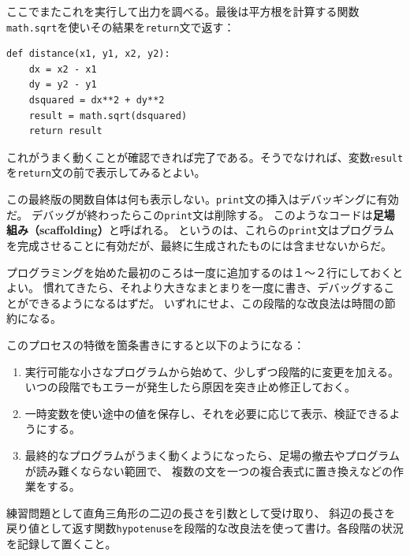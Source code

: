 \documentclass[a4j,12pt,makeidx]{jbook}
\begin{document}
ここでまたこれを実行して出力を調べる。最後は平方根を計算する関数{\tt math.sqrt}を使いその結果を{\tt return}文で返す：
\begin{verbatim}
def distance(x1, y1, x2, y2):
    dx = x2 - x1
    dy = y2 - y1
    dsquared = dx**2 + dy**2
    result = math.sqrt(dsquared)
    return result
\end{verbatim}
これがうまく動くことが確認できれば完了である。そうでなければ、変数r{\tt esult}を{\tt return}文の前で表示してみるとよい。\par
この最終版の関数自体は何も表示しない。{\tt print}文の挿入はデバッギングに有効だ。
デバッグが終わったらこの{\tt print}文は削除する。
このようなコードは{\bf 足場組み（scaffolding）}と呼ばれる。
というのは、これらの{\tt print}文はプログラムを完成させることに有効だが、最終に生成されたものには含ませないからだ。 \par
プログラミングを始めた最初のころは一度に追加するのは１～２行にしておくとよい。
慣れてきたら、それより大きなまとまりを一度に書き、デバッグすることができるようになるはずだ。
いずれにせよ、この段階的な改良法は時間の節約になる。\par
このプロセスの特徴を箇条書きにすると以下のようになる：
\begin{enumerate}
\item 実行可能な小さなプログラムから始めて、少しずつ段階的に変更を加える。
いつの段階でもエラーが発生したら原因を突き止め修正しておく。
\item 一時変数を使い途中の値を保存し、それを必要に応じて表示、検証できるようにする。
\item 最終的なプログラムがうまく動くようになったら、足場の撤去やプログラムが読み難くならない範囲で、
複数の文を一つの複合表式に置き換えなどの作業をする。
\end{enumerate}
練習問題として直角三角形の二辺の長さを引数として受け取り、
斜辺の長さを戻り値として返す関数{\tt hypotenuse}を段階的な改良法を使って書け。各段階の状況を記録して置くこと。
%
\end{document}

